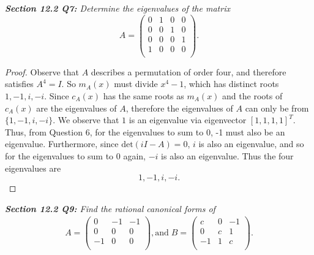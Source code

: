 \documentclass{article}
\begin{document}
\it \textbf{Section 12.2 Q7:} Determine the eigenvalues of the matrix
  \[A=\begin{pmatrix}
    0&1&0&0\\
    0&0&1&0\\
    0&0&0&1\\
    1&0&0&0\\
  \end{pmatrix}.\]

  \begin{proof}
    Observe that $A$ describes a permutation of order four, and therefore
    satisfies $A^4=I$. So $m_A(x)$ must divide $x^4-1$, which has distinct
    roots $1,-1,i,-i$. Since $c_A(x)$ has the same roots as $m_A(x)$ and
    the roots of $c_A(x)$ are the eigenvalues of $A$, therefore the
    eigenvalues of $A$ can only be from $\{1,-1,i,-i\}$. We observe that
    $1$ is an eigenvalue via eigenvector $[1,1,1,1]^T$. Thus, from
    Question 6, for the eigenvalues to sum to 0, -1 must also be an
    eigenvalue. Furthermore, since $\text{det}(iI-A)=0$, $i$ is also an
    eigenvalue, and so for the eigenvalues to sum to 0 again, $-i$ is also
    an eigenvalue. Thus the four eigenvalues are \[1,-1,i,-i.\]
  \end{proof}

\it \textbf{Section 12.2 Q9:} Find the rational canonical forms of
  \begin{align*}
    A=\begin{pmatrix}
      0&-1&-1\\
      0&0&0\\
      -1&0&0\\
    \end{pmatrix}, \text{and}\;
    B=\begin{pmatrix}
      c&0&-1\\
      0&c&1\\
      -1&1&c\\
    \end{pmatrix}.
  \end{align*}
\end{document}
